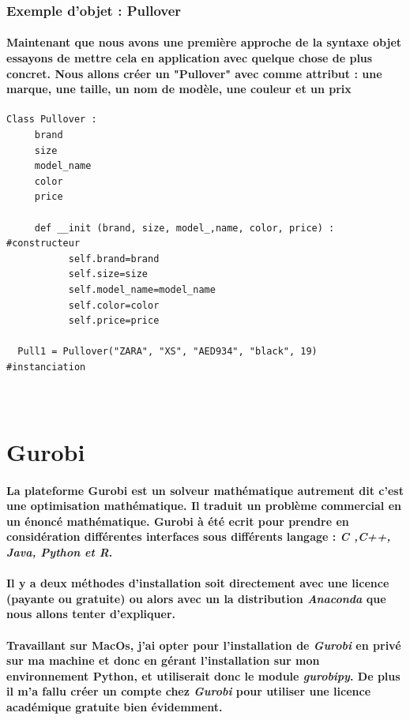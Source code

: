 \documentclass[a4paper, 12pt, twoside]{article}
\begin{document}
\subsubsection{Exemple d'objet : Pullover}
\paragraph{Maintenant que nous avons une première approche de la syntaxe objet essayons de mettre cela en application avec quelque chose de plus concret. Nous allons créer un "Pullover" avec comme attribut : une marque, une taille, un nom de modèle, une couleur et un prix }
\begin{verbatim}
Class Pullover : 
     brand
     size
     model_name
     color
     price
   
     def __init (brand, size, model_,name, color, price) :       #constructeur
           self.brand=brand
           self.size=size
           self.model_name=model_name
           self.color=color
           self.price=price
          
  Pull1 = Pullover("ZARA", "XS", "AED934", "black", 19)         #instanciation
  
          
\end{verbatim}
\newpage
\section{Gurobi}
\paragraph{La plateforme Gurobi est un solveur mathématique autrement dit c'est une optimisation mathématique. Il traduit un problème commercial en un énoncé mathématique. Gurobi à été ecrit pour prendre en considération différentes interfaces sous différents langage : \textit{C ,C++, Java, Python et R}.}

\paragraph{Il y a deux méthodes d'installation soit directement avec une licence (payante ou gratuite) ou alors avec un la distribution \textit{Anaconda} que nous allons tenter d'expliquer.}
\paragraph{Travaillant sur MacOs, j'ai opter pour l'installation de \textit{Gurobi} en privé sur ma machine et donc en gérant l'installation sur mon environnement Python, et utiliserait donc le module \emph{gurobipy}. De plus il m'a fallu créer un compte chez \textit{Gurobi} pour utiliser une licence académique gratuite bien évidemment.}
\end{document}
